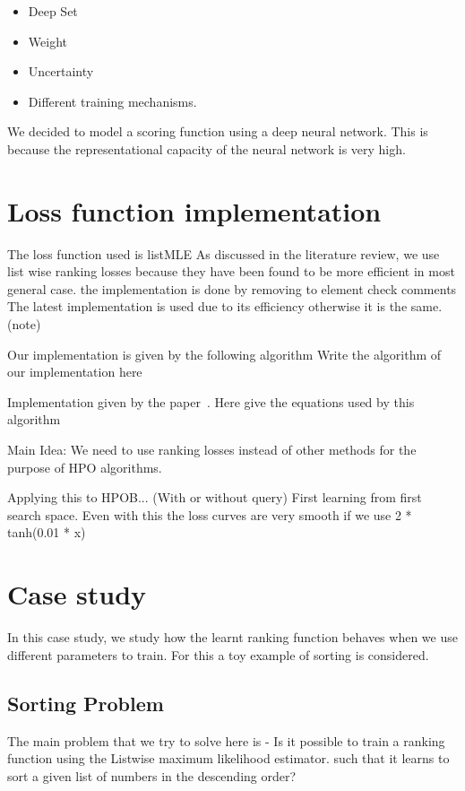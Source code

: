 \documentclass[11pt]{report}
\begin{document}
\begin{itemize}
\item Deep Set
\item Weight
\item Uncertainty
\item Different training mechanisms.
\end{itemize}

We decided to model a scoring function using a deep neural network.
This is because the representational capacity of the neural network is very high.


\section{Loss function implementation}
The loss function used is listMLE
As discussed in the literature review,  we use list wise ranking losses because they have been found to be more efficient in most general case.
the implementation is done by removing to element check comments
The latest implementation is used due to its efficiency otherwise it is the same. (note)

Our implementation is given by the following algorithm
Write the algorithm of our implementation here

Implementation given by the paper~\cite{Pobrotyn2020ContextAwareLT}.
Here give the equations used by this algorithm

Main Idea:
    We need to use ranking losses instead of other methods for the purpose of HPO algorithms.


Applying this to HPOB... (With or without query)
    First learning from first search space.
    Even with this the loss curves are very smooth if we use 2 * tanh(0.01 * x)

    
\section{Case study}

In this case study,  we study how the learnt ranking function behaves when we use different parameters to train.
For this a toy example of sorting is considered.


\subsection{Sorting Problem}
    
The main problem that we try to solve here is - Is it possible to train a ranking function using the Listwise maximum likelihood estimator. 
such that it learns to sort a given list of numbers in the descending order?
\end{document}
